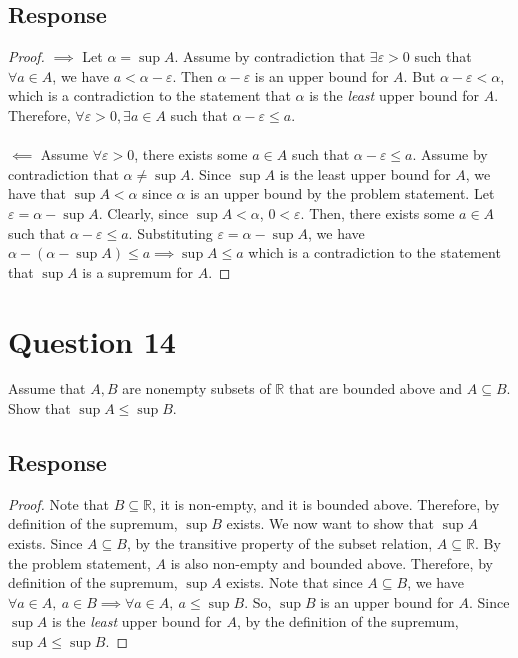 \documentclass[13pt]{article}
\begin{document}
\subsection*{Response}
\begin{proof}
  $\implies$ Let $\alpha = \sup{A}$. Assume by contradiction that $\exists \varepsilon > 0$ such that $\forall a \in
  A$, we have $a < \alpha - \varepsilon$. Then $\alpha - \varepsilon$ is an upper bound for $A$. But $\alpha
  - \varepsilon < \alpha$, which is a contradiction to the statement that $\alpha$ is the \textit{least} upper bound
  for $A$. Therefore, $\forall \varepsilon > 0, \exists a \in A$ such that $\alpha - \varepsilon \leq a$. \\ \\
  $\impliedby$ Assume $\forall \varepsilon > 0$, there exists some $a \in A$ such that $\alpha - \varepsilon \leq a$.
  Assume by contradiction that $\alpha \neq \sup{A}$. Since $\sup{A}$ is the least upper bound for $A$, we have that
  $\sup{A} < \alpha$ since $\alpha$ is an upper bound by the problem statement. Let $\varepsilon = \alpha - \sup{A}$.
  Clearly, since $\sup{A} < \alpha$, $0 < \varepsilon$. Then, there exists some $a \in A$ such that $\alpha -
  \varepsilon \leq a$. Substituting $\varepsilon = \alpha - \sup{A}$, we have $\alpha - (\alpha - \sup{A}) \leq a
  \implies \sup{A} \leq a$ which is a contradiction to the statement that $\sup{A}$ is a supremum for $A$.
\end{proof}

\newpage
\section*{Question 14}
Assume that $A, B$ are nonempty subsets of $\mathbb{R}$ that are bounded above and $A \subseteq
B$. Show that $\sup{A} \leq \sup{B}$.
\subsection*{Response}
\begin{proof}
  Note that $B \subseteq \mathbb{R}$, it is non-empty, and it is bounded above. Therefore, by definition of
  the supremum, $\sup{B}$ exists. We now want to show that $\sup{A}$ exists. Since $A \subseteq B$, by the
  transitive property of the subset relation, $A \subseteq \mathbb{R}$. By the problem statement, $A$ is also
  non-empty and bounded above. Therefore, by definition of the supremum, $\sup{A}$ exists. Note that since
  $A \subseteq B$, we have $\forall a \in A, \ a \in B \implies \forall a \in A, \ a \leq \sup{B}$. So, $\sup{B}$ is
  an upper bound for $A$. Since $\sup{A}$ is the \textit{least} upper bound for $A$, by the definition of the supremum,
  $\sup{A} \leq \sup{B}$.
\end{proof}
\end{document}
